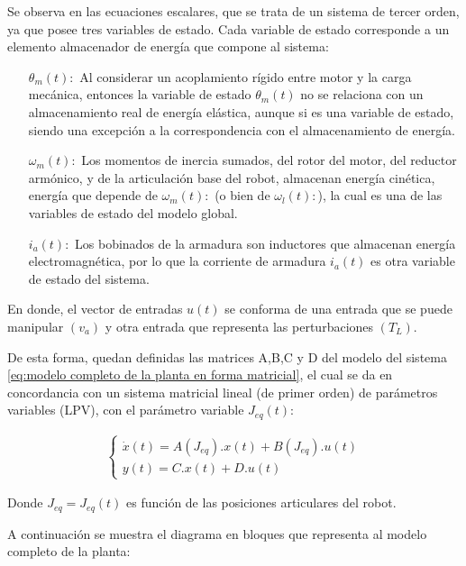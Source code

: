 \documentclass{article}
\begin{document}
\begin{sloppypar}
Se observa en las ecuaciones escalares, que se trata de un sistema de tercer orden, ya que posee tres variables de estado. Cada variable de estado corresponde a un elemento almacenador de energía que compone al sistema:
\begin{itemize}
    \item [$\theta_m(t):$] Al considerar un acoplamiento rígido entre motor y la carga mecánica, entonces la variable de estado $\theta_m\left(t\right)$ no se relaciona con un almacenamiento real de energía elástica, aunque si es una variable de estado, siendo una excepción a la correspondencia con el almacenamiento de energía.
    \item [$\omega_m(t):$] Los momentos de inercia sumados, del rotor del motor, del reductor armónico, y de la articulación base del robot, almacenan energía cinética, energía que depende de $\omega_m(t):$ (o bien de $\omega_l(t):$), la cual es una de las variables de estado del modelo global.
    \item [$i_a(t):$] Los bobinados de la armadura son inductores que almacenan energía electromagnética, por lo que la corriente de armadura $i_a(t)$ es otra variable de estado del sistema.
\end{itemize}
En donde, el vector de entradas $u(t)$ se conforma de una entrada que se puede manipular $(v_a)$ y otra entrada que representa las perturbaciones $(T_L)$.


De esta forma, quedan definidas las matrices A,B,C y D del modelo del sistema \ref{eq:modelo completo de la planta en forma matricial}, el cual se da en concordancia con un sistema matricial lineal (de primer orden) de parámetros variables (LPV), con el parámetro variable $J_{eq}(t)$:

\begin{align} \label{eq:sistema lineal de parámetros variables en el tiempo LPV}
    \begin{cases}
        \dot{x}\left(t\right)=A(J_{eq}).x(t)+B(J_{eq}).u(t)
        \\
        y\left(t\right)=C.x(t)+D.u(t)
    \end{cases}
\end{align}

Donde $J_{eq}=J_{eq}(t)$ es función de las posiciones articulares del robot.

A continuación se muestra el diagrama en bloques que representa al modelo completo de la planta:


\end{sloppypar}
\end{document}
